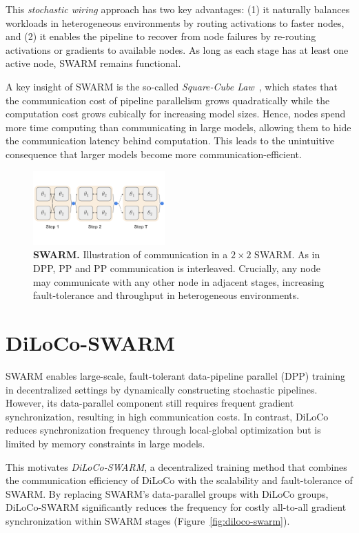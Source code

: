 \documentclass{article}
\begin{document}
This \textit{stochastic wiring} approach has two key advantages: (1) it naturally balances workloads in heterogeneous environments by routing activations to faster nodes, and (2) it enables the pipeline to recover from node failures by re-routing activations or gradients to available nodes. As long as each stage has at least one active node, SWARM remains functional.

A key insight of SWARM is the so-called \textit{Square-Cube Law}~\cite{ryabinin2023swarm}, which states that the communication cost of pipeline parallelism grows quadratically while the computation cost grows cubically for increasing model sizes. Hence, nodes spend more time computing than communicating in large models, allowing them to hide the communication latency behind computation. This leads to the unintuitive consequence that larger models become more communication-efficient.

\begin{figure}[ht]
    \centering
    \includegraphics[width=0.45\textwidth]{figures/swarm.pdf}
    \caption{\textbf{SWARM.} Illustration of communication in a $2 \times 2$ SWARM. As in DPP, PP and PP communication is interleaved. Crucially, any node may communicate with any other node in adjacent stages, increasing fault-tolerance and throughput in heterogeneous environments.}
    \label{fig:swarm}
\end{figure}

\section{DiLoCo-SWARM}

SWARM enables large-scale, fault-tolerant data-pipeline parallel (DPP) training in decentralized settings by dynamically constructing stochastic pipelines. However, its data-parallel component still requires frequent gradient synchronization, resulting in high communication costs. In contrast, DiLoCo~\cite{douillard2023diloco} reduces synchronization frequency through local-global optimization but is limited by memory constraints in large models.

This motivates \textit{DiLoCo-SWARM}, a decentralized training method that combines the communication efficiency of DiLoCo with the scalability and fault-tolerance of SWARM. By replacing SWARM's data-parallel groups with DiLoCo groups, DiLoCo-SWARM significantly reduces the frequency for costly
all-to-all gradient synchronization within SWARM stages (Figure~\ref{fig:diloco-swarm}).
\end{document}
